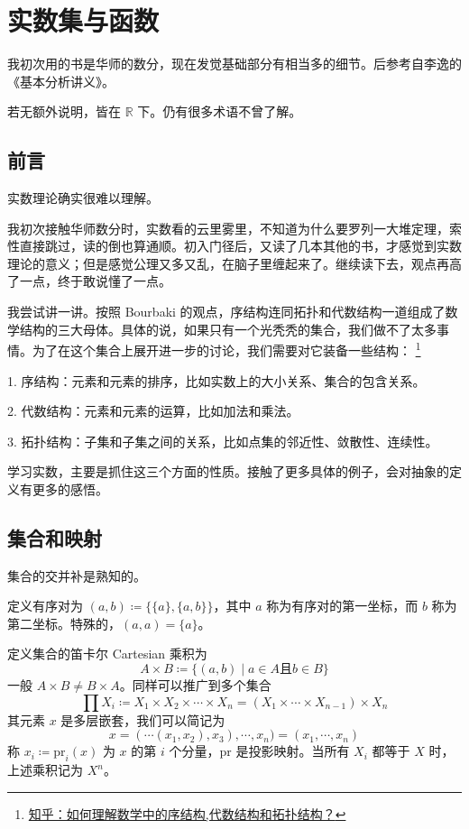 
\chapter{实数集与函数}

我初次用的书是华师的数分，现在发觉基础部分有相当多的细节。后参考自李逸的《基本分析讲义》。

若无额外说明，皆在 $\mathbb{R}$ 下。仍有很多术语不曾了解。

\section{前言}

实数理论确实很难以理解。

我初次接触华师数分时，实数看的云里雾里，不知道为什么要罗列一大堆定理，索性直接跳过，读的倒也算通顺。初入门径后，又读了几本其他的书，才感觉到实数理论的意义；但是感觉公理又多又乱，在脑子里缠起来了。继续读下去，观点再高了一点，终于敢说懂了一点。

我尝试讲一讲。按照 Bourbaki 的观点，序结构连同拓扑和代数结构一道组成了数学结构的三大母体。具体的说，如果只有一个光秃秃的集合，我们做不了太多事情。为了在这个集合上展开进一步的讨论，我们需要对它装备一些结构：
\footnote{\href{https://www.zhihu.com/question/47999353/answer/1012530744}{知乎：如何理解数学中的序结构,代数结构和拓扑结构？}}

1. 序结构：元素和元素的排序，比如实数上的大小关系、集合的包含关系。

2. 代数结构：元素和元素的运算，比如加法和乘法。

3. 拓扑结构：子集和子集之间的关系，比如点集的邻近性、敛散性、连续性。

学习实数，主要是抓住这三个方面的性质。接触了更多具体的例子，会对抽象的定义有更多的感悟。

\section{集合和映射}

集合的交并补是熟知的。

定义有序对为 $(a,b) \coloneqq  \{\{a\},\{a,b\}\}$，其中 $a$ 称为有序对的第一坐标，而 $b$ 称为第二坐标。特殊的，$(a,a) = \{a\}$。

定义集合的笛卡尔 Cartesian 乘积为
\[ A \times B \coloneqq  \{(a,b) \mid a\in A \text{且} b\in B\}\]
一般 $A \times B \ne B \times A$。同样可以推广到多个集合
\[ \prod X_i \coloneqq  X_1 \times X_2 \times \cdots \times X_n = (X_1 \times \cdots \times X_{n-1}) \times X_n\]
其元素 $x$ 是多层嵌套，我们可以简记为
\[ x = (\cdots(x_1,x_2),x_3),\cdots,x_n) = (x_1,\cdots,x_n)\]
称 $x_i \coloneqq  \mathrm{pr}_i(x)$ 为 $x$ 的第 $i$ 个分量，$\mathrm{pr}$ 是投影映射。当所有 $X_i$ 都等于 $X$ 时，上述乘积记为 $X^n$。

